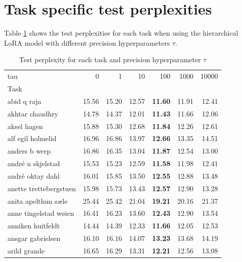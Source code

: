 \documentclass{article}
\begin{document}
\printbibliography

\appendix
\section{Task specific test perplexities}
Table \ref{tbl:task_perplexities} shows the test perplexities for each task when using the hierarchical LoRA model with different precision hyperparameters $\tau$.

\begin{table}[ht] \label{tbl:task_perplexities}
    \centering
    \caption{Test perplexity for each task and precision hyperparameter $\tau$}
    \begin{tabular}{lrrrrrr}
        \toprule
        tau & 0     & 1     & 10    &          100   & 1000  & 10000 \\
        Task                   &       &       &       &                &       &       \\
        \midrule
        abid q raja            & 15.56 & 15.20 & 12.57 & \textbf{11.60} & 11.91 & 12.41 \\
        akhtar chaudhry        & 14.78 & 14.37 & 12.01 & \textbf{11.43} & 11.66 & 12.06 \\
        aksel hagen            & 15.88 & 15.30 & 12.68 & \textbf{11.84} & 12.26 & 12.61 \\
        alf egil holmelid      & 16.96 & 16.86 & 13.97 & \textbf{12.66} & 13.35 & 14.51 \\
        anders b werp          & 16.86 & 16.35 & 13.04 & \textbf{11.87} & 12.54 & 13.00 \\
        andré n skjelstad      & 15.53 & 15.23 & 12.59 & \textbf{11.58} & 11.98 & 12.41 \\
        andré oktay dahl       & 16.01 & 15.85 & 13.50 & \textbf{12.55} & 12.88 & 13.48 \\
        anette trettebergstuen & 15.98 & 15.73 & 13.43 & \textbf{12.57} & 12.90 & 13.28 \\
        anita apelthun sæle    & 25.44 & 25.42 & 21.04 & \textbf{19.21} & 20.16 & 21.37 \\
        anne tingelstad wøien  & 16.41 & 16.23 & 13.60 & \textbf{12.43} & 12.90 & 13.54 \\
        anniken huitfeldt      & 14.44 & 14.39 & 12.33 & \textbf{11.66} & 12.05 & 12.53 \\
        ansgar gabrielsen      & 16.10 & 16.16 & 14.07 & \textbf{13.23} & 13.68 & 14.19 \\
        arild grande           & 16.65 & 16.29 & 13.31 & \textbf{12.21} & 12.56 & 13.08 \\

\end{tabular}
\end{table}
\end{document}
